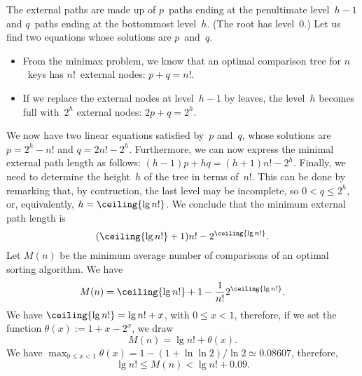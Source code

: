 The external paths are made up of \(p\)~paths ending at the
penultimate level~\(h-1\) and \(q\)~paths ending at the bottommost
level~\(h\). (The root has level~\(0\).) Let us find two equations
whose solutions are \(p\)~and~\(q\).
\begin{itemize}

  \item From the minimax problem, we know
    that an optimal comparison tree for \(n\)~keys has \(n!\)~external
    nodes: \(p+q=n!\).

  \item If we replace the external nodes at level~\(h-1\) by leaves,
    the level~\(h\) becomes full with~\(2^h\) external nodes:
    \(2p+q=2^h\).

\end{itemize}
We now have two linear equations satisfied by~\(p\) and~\(q\), whose
solutions are \(p=2^h-n!\) and \(q=2n!-2^h\). Furthermore, we can now
express the minimal external path length as follows: \((h-1)p + hq =
(h+1)n! - 2^h\). Finally, we need to determine the height~\(h\) of the
tree in terms of~\(n!\). This can be done by remarking that, by
contruction, the last level may be incomplete, so \(0 < q \leqslant
2^h\), or, equivalently, \(h = \ceiling{\lg n!}\). We conclude that
the minimum external path length is
\begin{equation*}
(\ceiling{\lg n!} + 1) n! - 2^{\ceiling{\lg n!}}.
\end{equation*}
Let \(M(n)\) \label{def:Mn} be the minimum average number of
comparisons of an optimal sorting algorithm. We have
\begin{equation*}
M(n) = \ceiling{\lg n!} + 1 - \frac{1}{n!}2^{\ceiling{\lg n!}}.
\end{equation*}
We have \(\ceiling{\lg n!} = \lg n! + x\), with \(0 \leqslant x < 1\),
therefore, if we set the function \(\theta(x) := 1 + x - 2^x\), we
draw
\begin{equation*}
M(n) = \lg n! + \theta(x).
\end{equation*}
We have \(\max_{0\leqslant x < 1}\theta(x) = 1 - (1 + \ln\ln 2)/\!\ln 2
\simeq 0.08607\), therefore,
\begin{equation}
\lg n! \leqslant M(n) < \lg n! + 0.09.
\label{ineq:Mn}
\end{equation}
